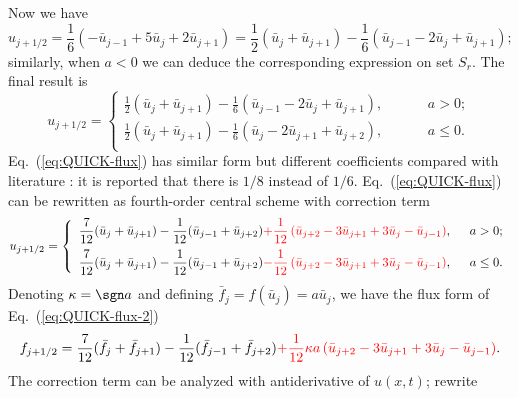 \documentclass[]{article}
\begin{document}
Now we have
\[u_{j+1/2}=\frac{1}{6}(-\bar u_{j-1}+5\bar u_j+2\bar u_{j+1})=\frac{1}{2}(\bar
u_j+\bar u_{j+1})-\frac{1}{6}(\bar u_{j-1}-2\bar u_j+\bar u_{j+1});\]
similarly, when $a<0$ we can deduce the corresponding expression on set
$S_r$. The final result is
\begin{equation}
  u_{j+1/2}=\left\{\begin{array}{ll}
  \displaystyle
  \frac{1}{2}(\bar u_j+\bar u_{j+1})-\frac{1}{6}(\bar u_{j-1}-2\bar u_j+\bar u_{j+1}),\hspace{1cm} & a>0;\\[3mm]
  \displaystyle
  \frac{1}{2}(\bar u_j+\bar u_{j+1})-\frac{1}{6}(\bar u_j-2\bar u_{j+1}+\bar u_{j+2}),\hspace{1cm} & a\le 0.\\
  \end{array}\right.
  \label{eq:QUICK-flux}
\end{equation}
Eq.~(\ref{eq:QUICK-flux}) has similar form but different coefficients compared
with literature \cite{leonard1979stable}: it is reported that there is $1/8$
instead of $1/6$.
Eq.~(\ref{eq:QUICK-flux}) can be rewritten as fourth-order central scheme with
correction term
\begin{equation}
  u_{j+1/2}=\left\{\begin{array}{ll}
  \displaystyle
  \frac{7}{12}(\bar u_j+\bar u_{j+1})-\frac{1}{12}(\bar u_{j-1}+\bar u_{j+2}){\color{red}+\frac{1}{12}\left(\bar u_{j+2}-3\bar u_{j+1}+3\bar u_{j}-\bar u_{j-1} \right)}     ,\hspace{2mm} & a>0;\\[3mm]
  \displaystyle
  \frac{7}{12}(\bar u_j+\bar u_{j+1})-\frac{1}{12}(\bar u_{j-1}+\bar u_{j+2}){\color{red}-\frac{1}{12}\left(\bar u_{j+2}-3\bar u_{j+1}+3\bar u_{j}-\bar u_{j-1} \right)}     ,\hspace{2mm} & a\le 0.\\
  \end{array}\right.
  \label{eq:QUICK-flux-2}
\end{equation}
Denoting $\kappa = \sgn a$ and defining $\bar f_j = f(\bar u_j) = a\bar u_j$, we
have the flux form of Eq.~(\ref{eq:QUICK-flux-2})
\begin{equation}
  f_{j+1/2}=
  \frac{7}{12}(\bar f_j+\bar f_{j+1})-\frac{1}{12}(\bar f_{j-1}+\bar
  f_{j+2}){\color{red}+\frac{1}{12}\kappa a\left(\bar u_{j+2}-3\bar u_{j+1}+3\bar
    u_{j}-\bar u_{j-1} \right)}.
  \label{eq:QUICK-flux-3}
\end{equation}
The correction term can be analyzed with antiderivative of $u(x,t)$; rewrite
\end{document}
